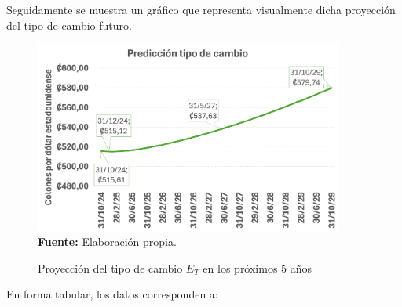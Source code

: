 \documentclass[12pt]{article}
\begin{document}
Seguidamente se muestra un gráfico que representa visualmente dicha proyección del tipo de cambio futuro.

\begin{figure}[H]
\renewcommand{\figurename}{Gráfico}
\caption{Proyección del tipo de cambio \( E_T \) en los próximos 5 años}
    \centering
    \includegraphics[width=0.9\textwidth]{grafico_tipo_de_cambio.png}
    \small\textbf{Fuente:} Elaboración propia.
    \label{fig:enter-label}
\end{figure}

En forma tabular, los datos corresponden a:


\end{document}
